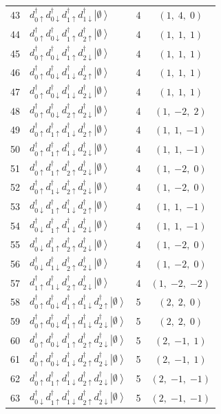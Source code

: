 \documentclass[11pt,a4paper]{article}
\newcommand{\ua}{\uparrow}
\newcommand{\da}{\downarrow}
\newcommand{\ket}[1]{\left|#1\right\rangle}
\newcommand{\empt}{\ket{\emptyset}}
\newcommand{\ddag}{d^{\dagger}}
\begin{document}
{\begin{longtable}{rp{8.6cm}cc}
43 & $\ddag_{0\ua}\ddag_{0\da}\ddag_{1\ua}\ddag_{1\da}\empt$
   & 4 & $(1,\;4,\;0)$ \\
44 & $\ddag_{0\ua}\ddag_{0\da}\ddag_{1\ua}\ddag_{2\ua}\empt$
   & 4 & $(1,\;1,\;1)$ \\
45 & $\ddag_{0\ua}\ddag_{0\da}\ddag_{1\ua}\ddag_{2\da}\empt$
   & 4 & $(1,\;1,\;1)$ \\
46 & $\ddag_{0\ua}\ddag_{0\da}\ddag_{1\da}\ddag_{2\ua}\empt$
   & 4 & $(1,\;1,\;1)$ \\
47 & $\ddag_{0\ua}\ddag_{0\da}\ddag_{1\da}\ddag_{2\da}\empt$
   & 4 & $(1,\;1,\;1)$ \\
48 & $\ddag_{0\ua}\ddag_{0\da}\ddag_{2\ua}\ddag_{2\da}\empt$
   & 4 & $(1,\;{-2},\;2)$ \\
49 & $\ddag_{0\ua}\ddag_{1\ua}\ddag_{1\da}\ddag_{2\ua}\empt$
   & 4 & $(1,\;1,\;{-1})$ \\
50 & $\ddag_{0\ua}\ddag_{1\ua}\ddag_{1\da}\ddag_{2\da}\empt$
   & 4 & $(1,\;1,\;{-1})$ \\
51 & $\ddag_{0\ua}\ddag_{1\ua}\ddag_{2\ua}\ddag_{2\da}\empt$
   & 4 & $(1,\;{-2},\;0)$ \\
52 & $\ddag_{0\ua}\ddag_{1\da}\ddag_{2\ua}\ddag_{2\da}\empt$
   & 4 & $(1,\;{-2},\;0)$ \\
53 & $\ddag_{0\da}\ddag_{1\ua}\ddag_{1\da}\ddag_{2\ua}\empt$
   & 4 & $(1,\;1,\;{-1})$ \\
54 & $\ddag_{0\da}\ddag_{1\ua}\ddag_{1\da}\ddag_{2\da}\empt$
   & 4 & $(1,\;1,\;{-1})$ \\
55 & $\ddag_{0\da}\ddag_{1\ua}\ddag_{2\ua}\ddag_{2\da}\empt$
   & 4 & $(1,\;{-2},\;0)$ \\
56 & $\ddag_{0\da}\ddag_{1\da}\ddag_{2\ua}\ddag_{2\da}\empt$
   & 4 & $(1,\;{-2},\;0)$ \\
57 & $\ddag_{1\ua}\ddag_{1\da}\ddag_{2\ua}\ddag_{2\da}\empt$
   & 4 & $(1,\;{-2},\;{-2})$ \\[3pt]
\midrule

58 & $\ddag_{0\ua}\ddag_{0\da}\ddag_{1\ua}\ddag_{1\da}\ddag_{2\ua}\empt$
   & 5 & $(2,\;2,\;0)$ \\
59 & $\ddag_{0\ua}\ddag_{0\da}\ddag_{1\ua}\ddag_{1\da}\ddag_{2\da}\empt$
   & 5 & $(2,\;2,\;0)$ \\
60 & $\ddag_{0\ua}\ddag_{0\da}\ddag_{1\ua}\ddag_{2\ua}\ddag_{2\da}\empt$
   & 5 & $(2,\;{-1},\;1)$ \\
61 & $\ddag_{0\ua}\ddag_{0\da}\ddag_{1\da}\ddag_{2\ua}\ddag_{2\da}\empt$
   & 5 & $(2,\;{-1},\;1)$ \\
62 & $\ddag_{0\ua}\ddag_{1\ua}\ddag_{1\da}\ddag_{2\ua}\ddag_{2\da}\empt$
   & 5 & $(2,\;{-1},\;{-1})$ \\
63 & $\ddag_{0\da}\ddag_{1\ua}\ddag_{1\da}\ddag_{2\ua}\ddag_{2\da}\empt$
   & 5 & $(2,\;{-1},\;{-1})$ \\[3pt]
\midrule


\end{longtable}}
\end{document}
